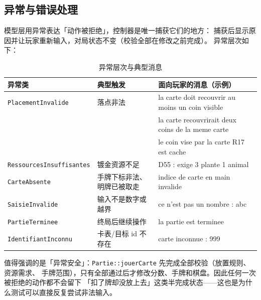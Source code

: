 \documentclass[11pt,a4paper]{ctexart}
\newcommand{\cl}[1]{\texttt{#1}}
\begin{document}
\subsection{异常与错误处理}
模型层用异常表达「动作被拒绝」，控制器是唯一捕获它们的地方：
捕获后显示原因并让玩家重新输入，对局状态不变（校验全部在修改之前完成）。
异常层次如下：

\begin{table}[h]
\centering
\small
\begin{tabular}{p{3.6cm}p{3.0cm}p{8.0cm}}
\toprule
异常类 & 典型触发 & 面向玩家的消息（示例） \\
\midrule
\cl{PlacementInvalide} & 落点非法 & la carte doit recouvrir au moins un coin visible \\
 &  & la carte recouvrirait deux coins de la meme carte \\
 &  & le coin vise par la carte R17 est cache \\
\cl{RessourcesInsuffisantes} & 镀金资源不足 & D55 : exige 3 plante 1 animal \\
\cl{CarteAbsente} & 手牌下标非法、明牌已被取走 & indice de carte en main invalide \\
\cl{SaisieInvalide} & 输入不是数字或越界 & ce n'est pas un nombre : abc \\
\cl{PartieTerminee} & 终局后继续操作 & la partie est terminee \\
\cl{IdentifiantInconnu} & 卡表/目标 id 不存在 & carte inconnue : 999 \\
\bottomrule
\end{tabular}
\caption{异常层次与典型消息}
\label{tab:exceptions}
\end{table}

值得强调的是「异常安全」：\cl{Partie::jouerCarte} 先完成全部校验（放置规则、资源需求、
手牌范围），只有全部通过后才修改分数、手牌和棋盘。因此任何一次被拒绝的动作都不会留下
「扣了牌却没放上去」这类半完成状态——这也是为什么测试可以直接反复尝试非法输入。
\end{document}
